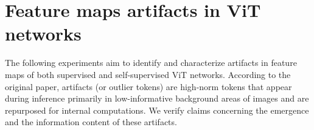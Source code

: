 \section{Feature maps artifacts in ViT networks}

The following experiments aim to identify and characterize artifacts in feature maps of both supervised and self-supervised ViT networks. According to the original paper, artifacts (or outlier tokens) are high-norm tokens that appear during inference primarily in low-informative background areas of images and are repurposed for internal computations. We verify claims concerning the emergence and the information content of these artifacts.






